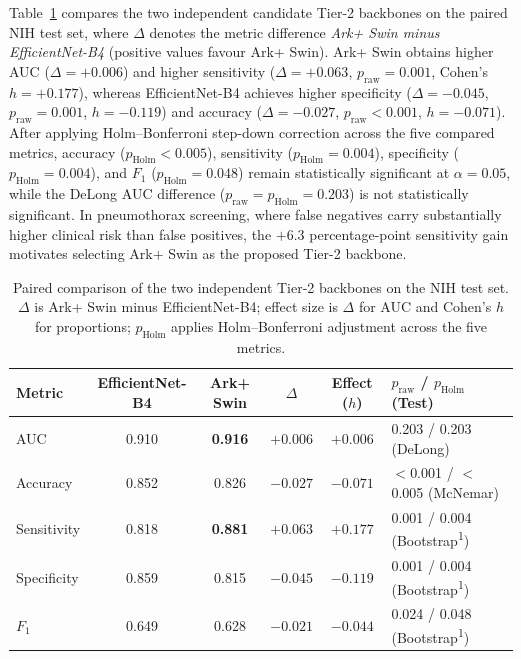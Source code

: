 \documentclass[diagnostics,article,submit,moreauthors]{Definitions/mdpi}
\newcommand{\rev}[1]{#1}
\begin{document}
Table~\ref{tab:backbone} compares the two independent candidate Tier-2 backbones on the paired NIH test set, \rev{where $\Delta$ denotes the metric difference \emph{Ark+ Swin minus EfficientNet-B4} (positive values favour Ark+ Swin).} Ark+ Swin obtains higher AUC ($\Delta = +0.006$) and higher sensitivity ($\Delta = +0.063$, $p_{\text{raw}} = 0.001$, \rev{Cohen's $h = +0.177$}), whereas EfficientNet-B4 achieves higher specificity ($\Delta = -0.045$, $p_{\text{raw}} = 0.001$, \rev{$h = -0.119$}) and accuracy ($\Delta = -0.027$, $p_{\text{raw}} < 0.001$, \rev{$h = -0.071$}). \rev{After applying Holm--Bonferroni step-down correction across the five compared metrics, accuracy ($p_{\text{Holm}} < 0.005$), sensitivity ($p_{\text{Holm}} = 0.004$), specificity ($p_{\text{Holm}} = 0.004$), and $F_1$ ($p_{\text{Holm}} = 0.048$) remain statistically significant at $\alpha=0.05$, while the DeLong AUC difference ($p_{\text{raw}} = p_{\text{Holm}} = 0.203$) is not statistically significant.} In pneumothorax screening, where false negatives carry substantially higher clinical risk than false positives, the $+6.3$ percentage-point sensitivity gain motivates selecting Ark+ Swin as the proposed Tier-2 backbone.

\begin{table}[H]
\caption{\rev{Paired comparison of the two independent Tier-2 backbones on the NIH test set. $\Delta$ is Ark+ Swin minus EfficientNet-B4; effect size is $\Delta$ for AUC and Cohen's $h$ for proportions; $p_{\text{Holm}}$ applies Holm--Bonferroni adjustment across the five metrics.}}\label{tab:backbone}
\begin{tabular}{@{}lccccl@{}}
\toprule
Metric & EfficientNet-B4 & Ark+ Swin & $\Delta$ & \rev{Effect ($h$)} & \rev{$p_{\text{raw}}$ / $p_{\text{Holm}}$ (Test)}\\
\midrule
AUC & 0.910 & \textbf{0.916} & $+0.006$ & $+0.006$ & 0.203 / 0.203 (DeLong)\\
Accuracy & 0.852 & 0.826 & $-0.027$ & $-0.071$ & $<$0.001 / $<$0.005 (McNemar)\\
Sensitivity & 0.818 & \textbf{0.881} & $+0.063$ & $+0.177$ & 0.001 / 0.004 (Bootstrap\textsuperscript{1})\\
Specificity & 0.859 & 0.815 & $-0.045$ & $-0.119$ & 0.001 / 0.004 (Bootstrap\textsuperscript{1})\\
$F_1$ & 0.649 & 0.628 & $-0.021$ & $-0.044$ & 0.024 / 0.048 (Bootstrap\textsuperscript{1})\\
\bottomrule
\end{tabular}
\end{table}
\end{document}
